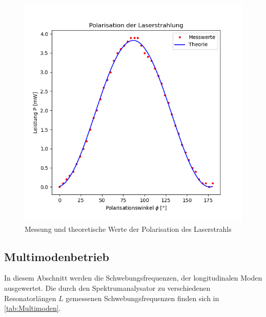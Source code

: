 \begin{figure}
\includegraphics{figures/Polarisation.png}
\caption{Messung und theoretische Werte der Polarisation des Laserstrahls}
\label{fig:Polarisation}
\end{figure}







\clearpage

\subsection{Multimodenbetrieb}
\label{sec:Multimodenbetrieb}

In diesem Abschnitt werden die Schwebungsfrequenzen, der longitudinalen Moden ausgewertet. 
Die durch den Spektrumanalysator zu verschiedenen Resonatorlängen $L$ gemessenen Schwebungsfrequenzen finden sich in \autoref{tab:Multimoden}.


